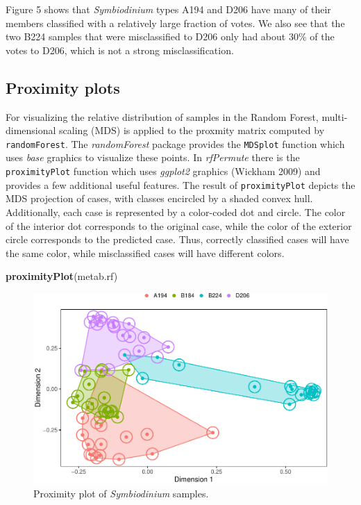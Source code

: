 \documentclass[]{article}
\newenvironment{Shaded}{\begin{snugshade}}{\end{snugshade}}
\newcommand{\KeywordTok}[1]{\textcolor[rgb]{0.13,0.29,0.53}{\textbf{{#1}}}}
\newcommand{\NormalTok}[1]{{#1}}
\begin{document}
Figure 5 shows that \emph{Symbiodinium} types A194 and D206 have many of
their members classified with a relatively large fraction of votes. We
also see that the two B224 samples that were misclassified to D206 only
had about 30\% of the votes to D206, which is not a strong
misclassification.

\subsection{Proximity plots}\label{proximity-plots}

For visualizing the relative distribution of samples in the Random
Forest, multi-dimensional scaling (MDS) is applied to the proxmity
matrix computed by \texttt{randomForest}. The \emph{randomForest}
package provides the \texttt{MDSplot} function which uses \emph{base}
graphics to visualize these points. In \emph{rfPermute} there is the
\texttt{proximityPlot} function which uses \emph{ggplot2} graphics
(Wickham 2009) and provides a few additional useful features. The result
of \texttt{proximityPlot} depicts the MDS projection of cases, with
classes encircled by a shaded convex hull. Additionally, each case is
represented by a color-coded dot and circle. The color of the interior
dot corresponds to the original case, while the color of the exterior
circle corresponds to the predicted case. Thus, correctly classified
cases will have the same color, while misclassified cases will have
different colors.

\begin{Shaded}
\begin{Highlighting}[]
\KeywordTok{proximityPlot}\NormalTok{(metab.rf)}
\end{Highlighting}
\end{Shaded}

\begin{figure}[htbp]
\centering
\includegraphics{rfPermute_ms_files/figure-latex/proximityPlot-1.pdf}
\caption{Proximity plot of \emph{Symbiodinium} samples.}
\end{figure}
\end{document}

